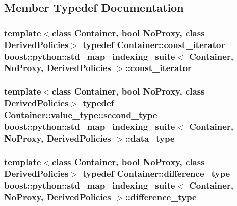 \subsection{Member Typedef Documentation}
\hypertarget{classboost_1_1python_1_1std__map__indexing__suite_aae0c4473455223a4e048cc207ca7b3ea}{
\subsubsection[{const\-\_\-iterator}]{\setlength{\rightskip}{0pt plus 5cm}template$<$class Container, bool No\-Proxy, class Derived\-Policies$>$ typedef Container\-::const\-\_\-iterator {\bf boost\-::python\-::std\-\_\-map\-\_\-indexing\-\_\-suite}$<$ Container, No\-Proxy, Derived\-Policies $>$\-::{\bf const\-\_\-iterator}}}\label{classboost_1_1python_1_1std__map__indexing__suite_aae0c4473455223a4e048cc207ca7b3ea}
\hypertarget{classboost_1_1python_1_1std__map__indexing__suite_a3e9a6a8b8ba34759cf0ba99fe5966041}{
\subsubsection[{data\-\_\-type}]{\setlength{\rightskip}{0pt plus 5cm}template$<$class Container, bool No\-Proxy, class Derived\-Policies$>$ typedef Container\-::value\-\_\-type\-::second\-\_\-type {\bf boost\-::python\-::std\-\_\-map\-\_\-indexing\-\_\-suite}$<$ Container, No\-Proxy, Derived\-Policies $>$\-::{\bf data\-\_\-type}}}\label{classboost_1_1python_1_1std__map__indexing__suite_a3e9a6a8b8ba34759cf0ba99fe5966041}
\hypertarget{classboost_1_1python_1_1std__map__indexing__suite_a54aa644dcb3913334f8b0152901940ef}{
\subsubsection[{difference\-\_\-type}]{\setlength{\rightskip}{0pt plus 5cm}template$<$class Container, bool No\-Proxy, class Derived\-Policies$>$ typedef Container\-::difference\-\_\-type {\bf boost\-::python\-::std\-\_\-map\-\_\-indexing\-\_\-suite}$<$ Container, No\-Proxy, Derived\-Policies $>$\-::{\bf difference\-\_\-type}}}\label{classboost_1_1python_1_1std__map__indexing__suite_a54aa644dcb3913334f8b0152901940ef}
